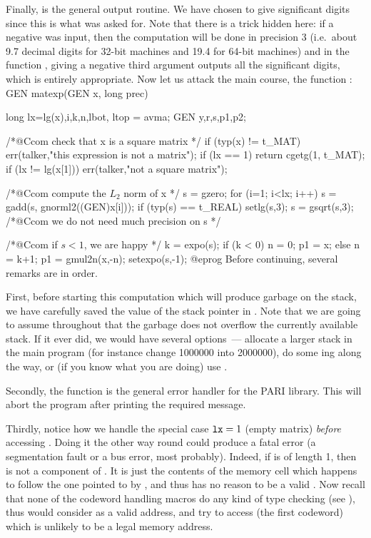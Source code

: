 Finally,  is the general output routine. We have chosen to give
 significant digits since this is what was asked for. Note that there
is a trick hidden here: if a negative  was input, then the computation
will be done in precision 3 (i.e.~about 9.7 decimal digits for 32-bit
machines and 19.4 for 64-bit machines) and in the function , giving
a negative third argument outputs all the significant digits, which is entirely
appropriate. Now let us attack the main course, the function :
%
\bprog
GEN
matexp(GEN x, long prec)
{
  long lx=lg(x),i,k,n,lbot, ltop = avma;
  GEN y,r,s,p1,p2;

  /*@Ccom check that x is a square matrix */
  if (typ(x) != t_MAT) err(talker,"this expression is not a matrix");
  if (lx == 1) return cgetg(1, t_MAT);
  if (lx != lg(x[1])) err(talker,"not a square matrix");

  /*@Ccom compute the $L_2$ norm of x */
  s = gzero;
  for (i=1; i<lx; i++)
    s = gadd(s, gnorml2((GEN)x[i]));
  if (typ(s) == t_REAL) setlg(s,3);
  s = gsqrt(s,3); /*@Ccom we do not need much precision on s */

  /*@Ccom if $s<1$, we are happy */
  k = expo(s);
  if (k < 0) { n = 0; p1 = x; }
  else { n = k+1; p1 = gmul2n(x,-n); setexpo(s,-1); }@eprog
\noindent
Before continuing, several remarks are in order.

First, before starting this computation which will produce garbage on the
stack, we have carefully saved the value of the stack pointer  in
. Note that we are going to assume throughout that the garbage does
not overflow the currently available stack. If it ever did, we would
have several options~--- allocate a larger stack in the main program (for
instance change 1000000 into 2000000), do some ing along the
way, or (if you know what you are doing) use .

Secondly, the  function is the general error handler for the
PARI library. This will abort the program after printing the required
message.

Thirdly, notice how we handle the special case ${\tt lx} = 1$ (empty matrix)
{\it before\/} accessing . Doing it the other way round could
produce a fatal error (a segmentation fault or a bus error, most probably).
Indeed, if  is of length 1, then  is not a component of
. It is just the contents of the memory cell which happens to follow
the one pointed to by , and thus has no reason to be a valid .
Now recall that none of the codeword handling macros do any kind of type
checking (see ), thus  would consider 
as a valid address, and try to access  (the first codeword)
which is unlikely to be a legal memory address.

}

